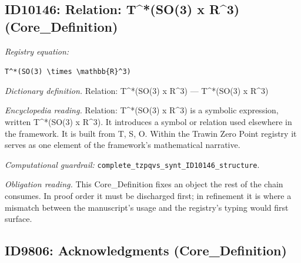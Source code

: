 \documentclass[11pt]{article}
\theoremstyle{remark}
\begin{document}
\subsection{ID10146: Relation: T\textasciicircum{}*(SO(3) x R\textasciicircum{}3) (Core\_Definition)}

\noindent\textit{Registry equation:}\par
{\small\texttt{T\textasciicircum{}*(SO(3) \textbackslash{}times \textbackslash{}mathbb\{R\}\textasciicircum{}3)}}\par\medskip
\noindent\textit{Dictionary definition.} Relation: T\textasciicircum{}*(SO(3) x R\textasciicircum{}3) --- T\textasciicircum{}*(SO(3) x R\textasciicircum{}3)\par\medskip
\noindent\textit{Encyclopedia reading.} Relation: T\textasciicircum{}*(SO(3) x R\textasciicircum{}3) is a symbolic expression, written T\textasciicircum{}*(SO(3) x R\textasciicircum{}3). It introduces a symbol or relation used elsewhere in the framework. It is built from T, S, O. Within the Trawin Zero Point registry it serves as one element of the framework's mathematical narrative.
\par\medskip\noindent\textit{Computational guardrail:} \texttt{complete\_tzpqvs\_synt\_ID10146\_structure}.
\par\medskip\noindent\textit{Obligation reading.} This Core\_Definition fixes an object the rest of the chain consumes. In proof order it must be discharged first; in refinement it is where a mismatch between the manuscript's usage and the registry's typing would first surface.

\subsection{ID9806: Acknowledgments (Core\_Definition)}
\end{document}
